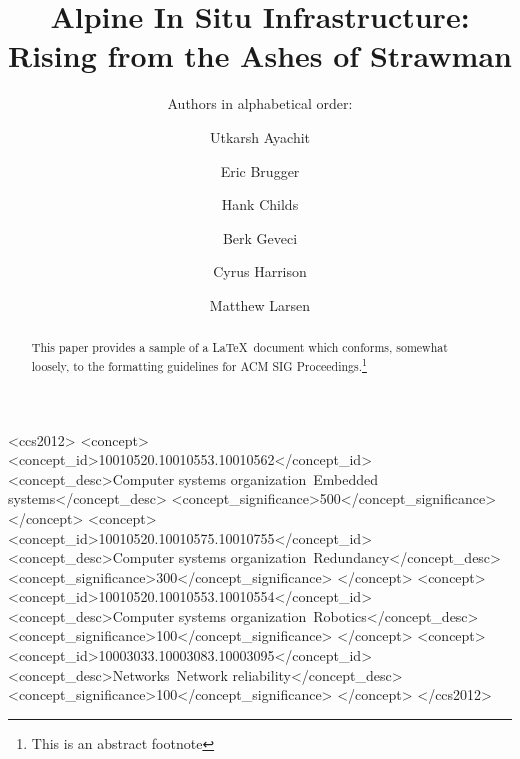 \documentclass[sigconf]{acmart}
\begin{document}
\title{Alpine In Situ Infrastructure: Rising from the Ashes of Strawman}
\subtitle{Authors in alphabetical order:}


\author{Utkarsh Ayachit}

\author{Eric Brugger}

\author{Hank Childs}


\author{Berk Geveci}

\author{Cyrus Harrison}

\author{Matthew Larsen}

\renewcommand{\shortauthors}{Humans et al.}



\begin{abstract}
This paper provides a sample of a \LaTeX\ document which conforms,
somewhat loosely, to the formatting guidelines for
ACM SIG Proceedings.\footnote{This is an abstract footnote}
\end{abstract}

%
%
\begin{CCSXML}
<ccs2012>
 <concept>
  <concept_id>10010520.10010553.10010562</concept_id>
  <concept_desc>Computer systems organization~Embedded systems</concept_desc>
  <concept_significance>500</concept_significance>
 </concept>
 <concept>
  <concept_id>10010520.10010575.10010755</concept_id>
  <concept_desc>Computer systems organization~Redundancy</concept_desc>
  <concept_significance>300</concept_significance>
 </concept>
 <concept>
  <concept_id>10010520.10010553.10010554</concept_id>
  <concept_desc>Computer systems organization~Robotics</concept_desc>
  <concept_significance>100</concept_significance>
 </concept>
 <concept>
  <concept_id>10003033.10003083.10003095</concept_id>
  <concept_desc>Networks~Network reliability</concept_desc>
  <concept_significance>100</concept_significance>
 </concept>
</ccs2012>  
\end{CCSXML}
\end{document}
